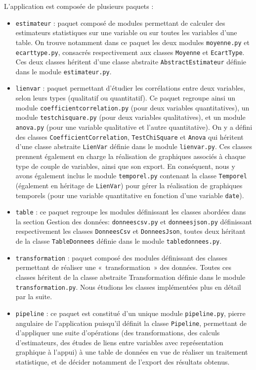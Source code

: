 \documentclass[11pt]{article}
\begin{document}
L'application est composée de plusieurs paquets :
\begin{itemize}
    \item \texttt{estimateur} : paquet composé de modules permettant de calculer des estimateurs statistiques sur une variable ou sur toutes les variables d'une table. On trouve notamment dans ce paquet les deux modules \texttt{moyenne.py} et \texttt{ecarttype.py}, consacrés respectivement aux classes \texttt{Moyenne} et \texttt{EcartType}. Ces deux classes héritent d'une classe abstraite \texttt{AbstractEstimateur} définie dans le module \texttt{estimateur.py}.
    
    \item \texttt{lienvar} : paquet permettant d'étudier les corrélations entre deux variables, selon leurs types (qualitatif ou quantitatif). Ce paquet regroupe ainsi un module \texttt{coefficientcorrelation.py} (pour deux variables quantitatives), un module \texttt{testchisquare.py} (pour deux variables qualitatives), et un module \texttt{anova.py} (pour une variable qualitative et l'autre quantitative). On y a défini des classes \texttt{CoefficientCorrelation}, \texttt{TestChiSquare} et \texttt{Anova} qui héritent d'une classe abstraite \texttt{LienVar} définie dans le module \texttt{lienvar.py}. Ces classes prennent également en charge la réalisation de graphiques associés à chaque type de couple de variables, ainsi que son export. En conséquent, nous y avons également inclus le module \texttt{temporel.py} contenant la classe \texttt{Temporel} (également en héritage de \texttt{LienVar}) pour gérer la réalisation de graphiques temporels (pour une variable quantitative en fonction d'une variable \texttt{date}).

    \item \texttt{table} : ce paquet regroupe les modules définissant les classes abordées dans la section Gestion des données: \texttt{donneescsv.py} et \texttt{donneesjson.py} définissant respectivement les classes \texttt{DonneesCsv} et \texttt{DonneesJson}, toutes deux héritant de la classe \texttt{TableDonnees} définie dans le module \texttt{tabledonnees.py}.
    
    \item \texttt{transformation} : paquet composé des modules définissant des classes permettant de réaliser une «~transformation~» des données. Toutes ces classes héritent de la classe abstraite Transformation définie dans le module \texttt{transformation.py}. Nous étudions les classes implémentées plus en détail par la suite. 
    
    \item \texttt{pipeline} : ce paquet est constitué d'un unique module \texttt{pipeline.py}, pierre angulaire de l'application puisqu'il définit la classe \texttt{Pipeline}, permettant de d'appliquer une suite d'opérations (des transformations, des calculs d'estimateurs, des études de liens entre variables avec représentation graphique à l'appui) à une table de données en vue de réaliser un traitement statistique, et de décider notamment de l'export des résultats obtenus. 
    
\end{itemize}
\end{document}
